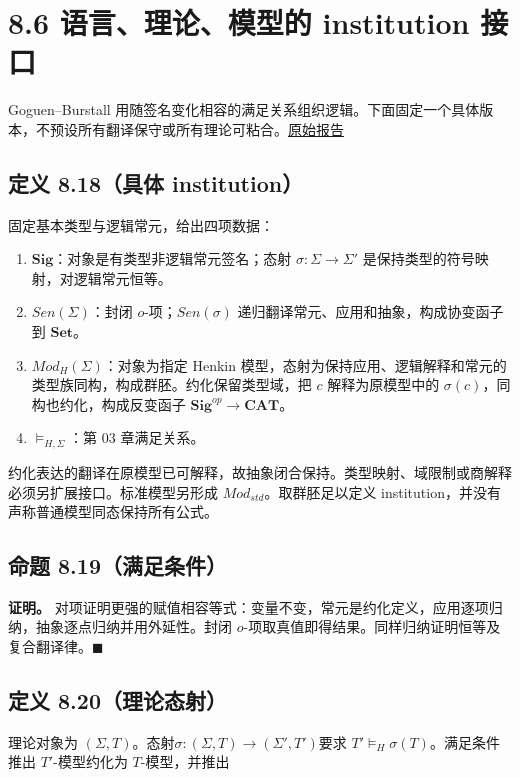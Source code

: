 \documentclass[UTF8,a4paper,zihao=-4,fontset=windows,openany]{ctexbook}
\newcommand{\mcsdisplay}[1]{%
  \par\addvspace{0.7em}%
  \sbox{\mcsmathbox}{\ensuremath{\displaystyle #1}}%
  \ifdim\wd\mcsmathbox>\linewidth
    \noindent\resizebox{\linewidth}{!}{\usebox{\mcsmathbox}}%
  \else
    \noindent\hspace*{\fill}\usebox{\mcsmathbox}\hspace*{\fill}%
  \fi
  \par\addvspace{0.7em}%
}
\def\ensuremath#1{#1}%
\def\mathrm#1{#1}%
\begin{document}
\section{8.6 语言、理论、模型的 institution 接口}
Goguen–Burstall 用随签名变化相容的满足关系组织逻辑。下面固定一个具体版本，不预设所有翻译保守或所有理论可粘合。\href{https://publish.lfcs.inf.ed.ac.uk/reports/90/ECS-LFCS-90-106/}{原始报告}

\subsection{定义 8.18（具体 institution）}
固定基本类型与逻辑常元，给出四项数据：

\begin{enumerate}
\item \(\mathbf{Sig}\)：对象是有类型非逻辑常元签名；态射 \(\sigma:\Sigma\to\Sigma'\) 是保持类型的符号映射，对逻辑常元恒等。
\item \(\mathrm{Sen}(\Sigma)\)：封闭 \(o\)-项；\(\mathrm{Sen}(\sigma)\) 递归翻译常元、应用和抽象，构成协变函子到 \(\mathbf{Set}\)。
\item \(\mathrm{Mod}_H(\Sigma)\)：对象为指定 Henkin 模型，态射为保持应用、逻辑解释和常元的类型族同构，构成群胚。约化保留类型域，把 \(c\) 解释为原模型中的 \(\sigma(c)\)，同构也约化，构成反变函子 \(\mathbf{Sig}^{op}\to\mathbf{CAT}\)。
\item \(\models_{H,\Sigma}\)：第 03 章满足关系。
\end{enumerate}
约化表达的翻译在原模型已可解释，故抽象闭合保持。类型映射、域限制或商解释必须另扩展接口。标准模型另形成 \(\mathrm{Mod}_{std}\)。取群胚足以定义 institution，并没有声称普通模型同态保持所有公式。

\subsection{命题 8.19（满足条件）}

\mcsdisplay{A'\models_{\Sigma'}\mathrm{Sen}(\sigma)(\varphi)
\iff\mathrm{Mod}(\sigma)(A')\models_\Sigma\varphi.}
\noindent \textbf{证明。} 对项证明更强的赋值相容等式：变量不变，常元是约化定义，应用逐项归纳，抽象逐点归纳并用外延性。封闭 \(o\)-项取真值即得结果。同样归纳证明恒等及复合翻译律。\(\blacksquare\)

\subsection{定义 8.20（理论态射）}
理论对象为 \((\Sigma,T)\)。态射\(\sigma:(\Sigma,T)\to(\Sigma',T')\)要求 \(T'\models_H\sigma(T)\)。满足条件推出 \(T'\)-模型约化为 \(T\)-模型，并推出
\end{document}
